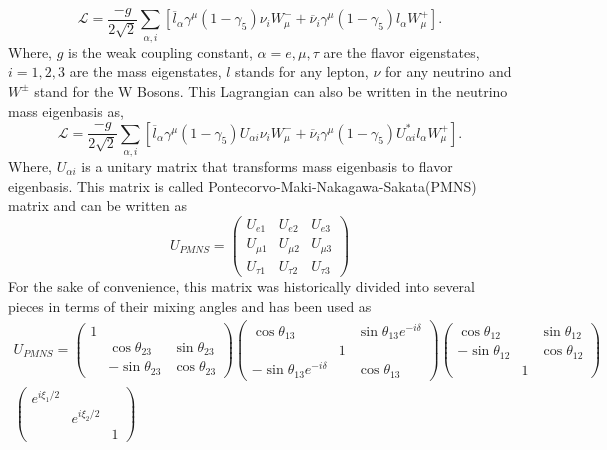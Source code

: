 \documentclass[11pt]{article}
\numberwithin{equation}{section}
\begin{document}
\begin{equation} \mathcal{L} = \frac{-g}{2 \sqrt{2}} \sum\limits_{\alpha , i} [\overline{l}_{\alpha} \gamma^{\mu}(1-\gamma_{5})\nu_{i} W^{-}_{\mu} + \overline{\nu}_{i} \gamma^{\mu}(1-\gamma_{5})l_{\alpha} W^{+}_{\mu}].
\end{equation}
Where, $g$ is the weak coupling constant, $\alpha = e,\mu,\tau$ are the flavor eigenstates, $i=1, 2, 3$ are the mass eigenstates, $l$ stands for any lepton, $\nu$ for any neutrino and $W^{\pm}$ stand for the W Bosons. This Lagrangian can also be written in the neutrino mass eigenbasis as, 
\begin{equation} \mathcal{L} = \frac{-g}{2 \sqrt{2}} \sum\limits_{\alpha , i} [\overline{l}_{\alpha} \gamma^{\mu}(1-\gamma_{5})U_{\alpha i}\nu_{i} W^{-}_{\mu} + \overline{\nu}_{i} \gamma^{\mu}(1-\gamma_{5})U^{*}_{\alpha i}l_{\alpha} W^{+}_{\mu}].
\end{equation}
 Where, $U_{\alpha i}$ is a unitary matrix that transforms mass eigenbasis to flavor eigenbasis. This matrix is called Pontecorvo-Maki-Nakagawa-Sakata(PMNS) matrix and can be written as 
 \begin{equation}
U_{PMNS} = \begin{pmatrix}
U_{e1} & U_{e2} & U_{e3} \\
U_{\mu 1} & U_{\mu 2} & U_{\mu3} \\
U_{\tau 1} & U_{\tau 2} & U_{\tau 3} 
     \end{pmatrix}
\end{equation}
For the sake of convenience, this matrix was historically divided into several pieces in terms of their mixing angles and has been used as
\begin{align}
U_{PMNS} =
\begin{pmatrix}
1 &  & \\
 & \cos{\theta_{23}}& \sin{\theta_{23}}\\
 &  - \sin{\theta_{23}} & \cos{\theta_{23}} 
\end{pmatrix}
\begin{pmatrix}
\cos{\theta_{13}}&  & \sin{\theta_{13}} e^{-i \delta} \\
& 1& \\
- \sin{\theta_{13}} e^{-i \delta}&  & \cos{\theta_{13}} 
\end{pmatrix}
\begin{pmatrix}
\cos{\theta_{12}}&& \sin{\theta_{12}}  \\
- \sin{\theta_{12}} &  & \cos{\theta_{12}} \\
& 1&
\end{pmatrix} \nonumber \\
\begin{pmatrix}
e^{i\xi_{1}/2}&&   \\
 & e^{i\xi_{2}/2}  &  \\
& &1
\end{pmatrix}
\end{align}
\end{document}
